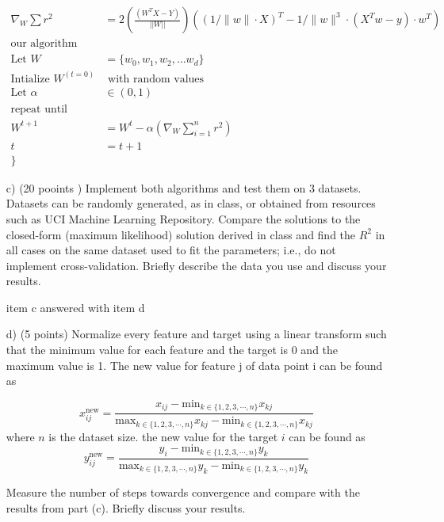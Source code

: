 \documentclass[a4 paper]{article}
\begin{document}
\begin{enumerate}
\begin{equation*}
\begin{split}
		 \nabla_W \sum r^2 & = 2(\frac{(W^TX -Y)}{||W||})((1/\|w\|\cdot X)^T -1/\|w\|^{3}\cdot (X^Tw-y)\cdot w^T ) \\
		 \text{our algorithm follows:} \\
		 	\text{Let } W & = \{w_0, w_1, w_2, \dots w_d \} \\
	\text{Intialize } W^{(t=0)} & \text{ with random values} \\
	\text{Let } \alpha & \in (0 , 1) \\
		 	\text{repeat until convergence: \{} \\
	W^{t+1} & = W^{t} - \alpha(\nabla_W \sum_{i=1}^n{r^2}) \\
	t & =  t + 1 \\ 
	\}
	\end{split}
	\end{equation*}
	
	\item[c)] (20 pooints
	) Implement both algorithms and test them on 3 datasets. Datasets can be randomly generated, as in class, or obtained from resources such as UCI Machine Learning Repository. Compare the solutions to the closed-form (maximum likelihood) solution derived in class and find the $R^2$ in all cases on the same dataset used to fit the parameters; i.e., do not implement cross-validation. Briefly describe the data you use and discuss your results. 
	
	item c answered with item d
\item[d)] (5 points) Normalize every feature and target using a linear transform such that the minimum value for each feature and the target is 0 and the maximum value is 1. The new value for feature j of data point i can be found as

\begin{equation*}
x_{ij}^{\text{new}} = \frac{x_{ij} - \text{min}_{k \in \{1,2,3, \cdots, n \}}x_{kj}}{\text{max}_{k \in \{1,2,3, \cdots, n \}}x_{kj} - \text{min}_{k \in \{1,2,3, \cdots, n \}}x_{kj}}
\end{equation*}
where $n$ is the dataset size. the new value for the target $i$ can be found as
\begin{equation*}
y_{ij}^{\text{new}} = \frac{y_{i} - \text{min}_{k \in \{1,2,3, \cdots, n \}}y_{k}}{\text{max}_{k \in \{1,2,3, \cdots, n \}}y_{k} - \text{min}_{k \in \{1,2,3, \cdots, n \}}y_{k}}
\end{equation*}

Measure the number of steps towards convergence and compare with the results from part (c). Briefly
discuss your results.


\end{enumerate}
\end{document}
